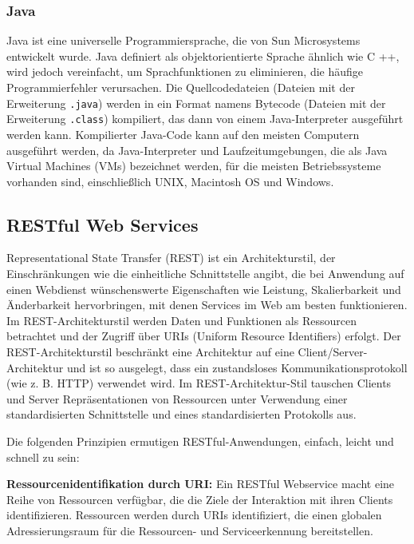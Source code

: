 \subsubsection{Java}

Java ist eine universelle Programmiersprache, die von Sun Microsystems entwickelt wurde. Java definiert als objektorientierte Sprache ähnlich wie C ++, wird jedoch vereinfacht, um Sprachfunktionen zu eliminieren, die häufige Programmierfehler verursachen. Die Quellcodedateien (Dateien mit der Erweiterung \texttt{.java}) werden in ein Format namens Bytecode (Dateien mit der Erweiterung \texttt{.class}) kompiliert, das dann von einem Java-Interpreter ausgeführt werden kann. Kompilierter Java-Code kann auf den meisten Computern ausgeführt werden, da Java-Interpreter und Laufzeitumgebungen, die als Java Virtual Machines (VMs) bezeichnet werden, für die meisten Betriebssysteme vorhanden sind, einschließlich UNIX, Macintosh OS und Windows\cite{java18beal}.

\subsection{RESTful Web Services}

Representational State Transfer (REST) ist ein Architekturstil, der Einschränkungen wie die einheitliche Schnittstelle angibt, die bei Anwendung auf einen Webdienst wünschenswerte Eigenschaften wie Leistung, Skalierbarkeit und Änderbarkeit hervorbringen, mit denen Services im Web am besten funktionieren. Im REST-Architekturstil werden Daten und Funktionen als Ressourcen betrachtet und der Zugriff über URIs (Uniform Resource Identifiers) erfolgt. Der REST-Architekturstil beschränkt eine Architektur auf eine Client/Server-Architektur und ist so ausgelegt, dass ein zustandsloses Kommunikationsprotokoll (wie z. B. HTTP) verwendet wird. Im REST-Architektur-Stil tauschen Clients und Server Repräsentationen von Ressourcen unter Verwendung einer standardisierten Schnittstelle und eines standardisierten Protokolls aus\cite{rws13od}.

Die folgenden Prinzipien ermutigen RESTful-Anwendungen, einfach, leicht und schnell zu sein:

\textbf{Ressourcenidentifikation durch URI:} Ein RESTful Webservice macht eine Reihe von Ressourcen verfügbar, die die Ziele der Interaktion mit ihren Clients identifizieren. Ressourcen werden durch URIs identifiziert, die einen globalen Adressierungsraum für die Ressourcen- und Serviceerkennung bereitstellen.

